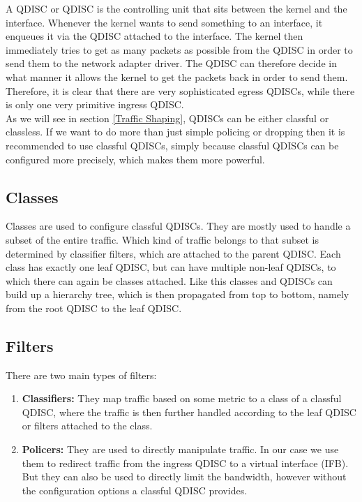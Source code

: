 A \acs{QDISC} or \acl{QDISC} is the controlling unit that sits between the kernel and the interface. Whenever the kernel wants to send something to an interface, it enqueues it via the \acs{QDISC} attached to the interface. The kernel then immediately tries to get as many packets as possible from the \acs{QDISC} in order to send them to the network adapter driver. The \acs{QDISC} can therefore decide in what manner it allows the kernel to get the packets back in order to send them. Therefore, it is clear that there are very sophisticated egress \acsp{QDISC}, while there is only one very primitive ingress \acs{QDISC}.
\\
As we will see in section \ref{Traffic Shaping}, \acsp{QDISC} can be either classful or classless. If we want to do more than just simple policing or dropping then it is recommended to use classful \acsp{QDISC}, simply because classful \acsp{QDISC} can be configured more precisely, which makes them more powerful.

\subsection{Classes}

Classes are used to configure classful \acsp{QDISC}. They are mostly used to handle a subset of the entire traffic. Which kind of traffic belongs to that subset is determined by classifier filters, which are attached to the parent \acs{QDISC}. Each class has exactly one leaf \acs{QDISC}, but can have multiple non-leaf \acsp{QDISC}, to which there can again be classes attached. Like this classes and \acsp{QDISC} can build up a hierarchy tree, which is then propagated from top to bottom, namely from the root \acs{QDISC} to the leaf \acs{QDISC}.

\subsection{Filters}
There are two main types of filters:
\begin{enumerate}
\item \textbf{Classifiers:} They map traffic based on some metric to a class of a classful \acs{QDISC}, where the traffic is then further handled according to the leaf \acs{QDISC} or filters attached to the class.
\item \textbf{Policers:} They are used to directly manipulate traffic. In our case we use them to redirect traffic from the ingress \acs{QDISC} to a virtual interface (\ac{IFB}). But they can also be used to directly limit the bandwidth, however without the configuration options a classful \acs{QDISC} provides.
\end{enumerate}


